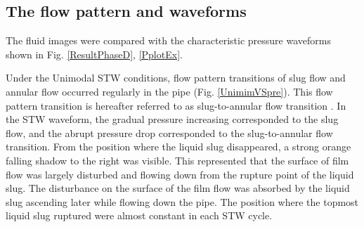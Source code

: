 \documentclass[aps,pre,preprint,groupedaddress,showkeys]{revtex4-2}
\begin{document}
\subsection{The flow pattern and waveforms}\label{PandF}
The fluid images were compared with the characteristic pressure waveforms shown in Fig. \ref{ResultPhaseD}, \ref{PplotEx}.


Under the Unimodal STW conditions, flow pattern transitions of slug flow and annular flow occurred regularly in the pipe (Fig. \ref{UnimimVSpre}). This flow pattern transition is hereafter referred to as slug-to-annular flow transition \citep{kanno2018}.
In the STW waveform, the gradual pressure increasing corresponded to the slug flow, and the abrupt pressure drop corresponded to the slug-to-annular flow transition.
From the position where the liquid slug disappeared, a strong orange falling shadow to the right was visible.
This represented that the surface of film flow was largely disturbed and flowing down from the rupture point of the liquid slug.
The disturbance on the surface of the film flow was absorbed by the liquid slug ascending later while flowing down the pipe.
The position where the topmost liquid slug ruptured were almost constant in each STW cycle.
\end{document}
